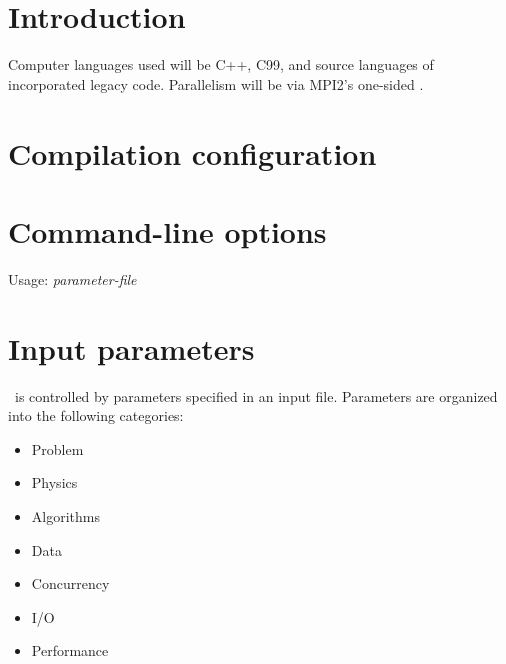 \documentclass{article}
\begin{document}

\tableofcontents
\section{Introduction} \label{s:intro}

Computer languages used will be C++, C99, and source languages of
incorporated legacy code.  Parallelism will be via MPI2's one-sided
.

\section{Compilation configuration} \label{s:compile}

\section{Command-line options} \label{s:commandline}

Usage:  \textit{parameter-file}

\section{Input parameters} \label{s:input}

\cello\ is controlled by parameters specified in an input file.  Parameters
are organized into the following categories:

\begin{itemize}
\item Problem
\item Physics
\item Algorithms
\item Data
\item Concurrency
\item I/O
\item Performance
\end{itemize}
\end{document}
